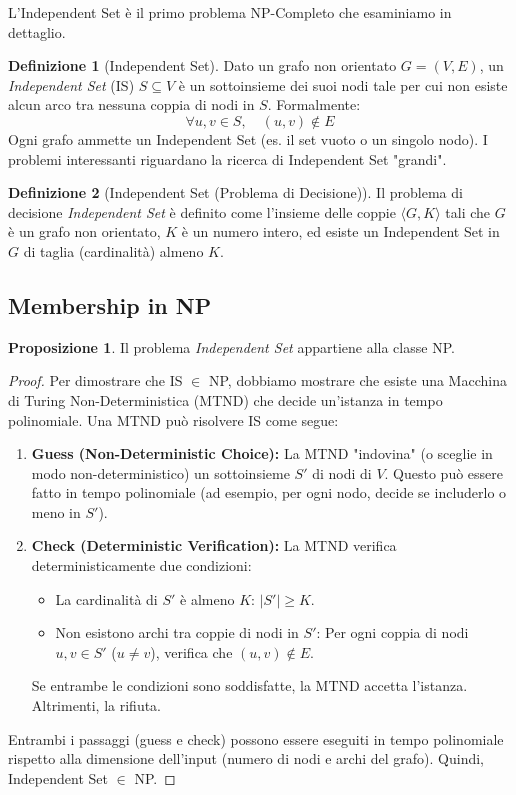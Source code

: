 \documentclass[a4paper]{article}
\theoremstyle{definition} %
\newtheorem{definition}{Definizione}[section]
\newtheorem{proposition}{Proposizione}[section]
\theoremstyle{definition} %
\begin{document}
L'Independent Set è il primo problema NP-Completo che esaminiamo in dettaglio.

\begin{definition}[Independent Set]
Dato un grafo non orientato $G=(V, E)$, un \emph{Independent Set} (IS) $S \subseteq V$ è un sottoinsieme dei suoi nodi tale per cui non esiste alcun arco tra nessuna coppia di nodi in $S$. Formalmente:
\[ \forall u, v \in S, \quad (u, v) \notin E \]
Ogni grafo ammette un Independent Set (es. il set vuoto o un singolo nodo). I problemi interessanti riguardano la ricerca di Independent Set "grandi".
\end{definition}

\begin{definition}[Independent Set (Problema di Decisione)]
Il problema di decisione \emph{Independent Set} è definito come l'insieme delle coppie $\langle G, K \rangle$ tali che $G$ è un grafo non orientato, $K$ è un numero intero, ed esiste un Independent Set in $G$ di taglia (cardinalità) almeno $K$.
\end{definition}

\subsection{Membership in NP}

\begin{proposition}
Il problema \emph{Independent Set} appartiene alla classe NP.
\end{proposition}

\begin{proof}
Per dimostrare che IS $\in$ NP, dobbiamo mostrare che esiste una Macchina di Turing Non-Deterministica (MTND) che decide un'istanza in tempo polinomiale.
Una MTND può risolvere IS come segue:
\begin{enumerate}
    \item \textbf{Guess (Non-Deterministic Choice):} La MTND "indovina" (o sceglie in modo non-deterministico) un sottoinsieme $S'$ di nodi di $V$. Questo può essere fatto in tempo polinomiale (ad esempio, per ogni nodo, decide se includerlo o meno in $S'$).
    \item \textbf{Check (Deterministic Verification):} La MTND verifica deterministicamente due condizioni:
    \begin{itemize}
        \item La cardinalità di $S'$ è almeno $K$: $|S'| \ge K$.
        \item Non esistono archi tra coppie di nodi in $S'$: Per ogni coppia di nodi $u, v \in S'$ ($u \ne v$), verifica che $(u, v) \notin E$.
    \end{itemize}
    Se entrambe le condizioni sono soddisfatte, la MTND accetta l'istanza. Altrimenti, la rifiuta.
\end{enumerate}
Entrambi i passaggi (guess e check) possono essere eseguiti in tempo polinomiale rispetto alla dimensione dell'input (numero di nodi e archi del grafo). Quindi, Independent Set $\in$ NP.
\end{proof}
\end{document}

